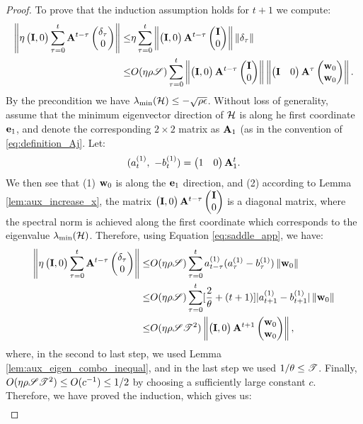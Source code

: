 \begin{proof}
To prove that the induction assumption holds for $t+1$ we compute:
\begin{align}
\left\|{\eta\begin{pmatrix} \mathbf{I}, 0 \end{pmatrix}\sum_{\tau = 0}^{t} \mathbf{A}^{t-\tau}\begin{pmatrix} \delta_\tau \\ 0 \end{pmatrix} }\right\|
\le& \eta \sum_{\tau = 0}^{t} \left\|{\begin{pmatrix} \mathbf{I}, 0 \end{pmatrix}\mathbf{A}^{t-\tau}\begin{pmatrix} \mathbf{I} \\ 0 \end{pmatrix}}\right\|
\left\|{\delta_\tau}\right\|  \nonumber \\
\le& O(\eta\rho\mathscr{S}) \sum_{\tau = 0}^{t} \left\|{\begin{pmatrix} \mathbf{I}, 0 \end{pmatrix}\mathbf{A}^{t-\tau}\begin{pmatrix} \mathbf{I} \\ 0 \end{pmatrix}}\right\|
\left\|{\begin{pmatrix} \mathbf{I} & 0 \end{pmatrix}\mathbf{A}^{\tau}\begin{pmatrix} \mathbf{w}_0 \\ \mathbf{w}_{0} \end{pmatrix}}\right\|. \label{eq:saddle_app}
\end{align}
By the precondition we have $\lambda_{\min}(\mathcal{H}) \le -\sqrt{\rho\epsilon}$. 
Without loss of generality, assume that the minimum eigenvector direction 
of $\mathcal{H}$ is along he first coordinate $\mathbf{e}_1$, and denote the corresponding 
$2\times 2$ matrix as $\mathbf{A}_1$ (as in the convention of \eqref{eq:definition_Aj}. 
Let:
\begin{equation*}
(a^{(1)}_{t}, ~-b^{(1)}_t) =\begin{pmatrix} 1 & 0  \end{pmatrix}\mathbf{A}_1^{t}.
\end{equation*} 
We then see that (1) $\mathbf{w}_0$ is along the $\mathbf{e}_1$ direction, 
and (2) according to Lemma \ref{lem:aux_increase_x}, the matrix 
$\begin{pmatrix} \mathbf{I}, 0 \end{pmatrix}\mathbf{A}^{t-\tau}\begin{pmatrix} \mathbf{I} \\ 0 \end{pmatrix}$ is a diagonal matrix, where the spectral norm is achieved along the first coordinate which corresponds to the eigenvalue 
$\lambda_{\min}(\mathcal{H})$. Therefore, using Equation \eqref{eq:saddle_app}, we have:
\begin{align*}
\left\|{\eta\begin{pmatrix} \mathbf{I}, 0 \end{pmatrix}\sum_{\tau = 0}^{t} \mathbf{A}^{t-\tau}\begin{pmatrix} \delta_\tau \\ 0 \end{pmatrix} }\right\|
\le& O(\eta\rho\mathscr{S}) \sum_{\tau = 0}^t a^{(1)}_{t-\tau}(a^{(1)}_{\tau} - b^{(1)}_{\tau}) \left\|{\mathbf{w}_0}\right\|\\
\le& O(\eta\rho\mathscr{S}) \sum_{\tau =0}^t [\frac{2}{\theta} + (t+1)] |a^{(1)}_{t+1} - b^{(1)}_{t+1}|\left\|{\mathbf{w}_0}\right\|\\
\le& O(\eta\rho\mathscr{S}\mathscr{T}^2)\left\|{\begin{pmatrix} \mathbf{I}, 0 \end{pmatrix}\mathbf{A}^{t+1}\begin{pmatrix} \mathbf{w}_0 \\ \mathbf{w}_{0} \end{pmatrix}}\right\|,
\end{align*}
where, in the second to last step, we used Lemma \ref{lem:aux_eigen_combo_inequal}, and in the last step we used $1/\theta \le \mathscr{T}$. Finally,
$O(\eta\rho\mathscr{S}\mathscr{T}^2) \le O(c^{-1})\le 1/2$ by choosing a sufficiently large constant $c$. Therefore, we have proved the induction, which gives us:
\begin{align*}

\end{align*}
\end{proof}
